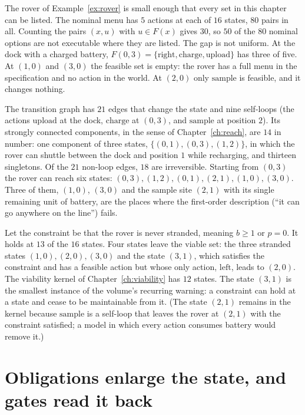 The rover of Example~\ref{ex:rover} is small enough that every set in this chapter can be listed. The nominal menu has $5$ actions at each of $16$ states, $80$ pairs in all. Counting the pairs $(x,u)$ with $u\in F(x)$ gives $30$, so $50$ of the $80$ nominal options are not executable where they are listed. The gap is not uniform. At the dock with a charged battery, $F(0,3)=\{\mathrm{right},\mathrm{charge},\mathrm{upload}\}$ has three of five. At $(1,0)$ and $(3,0)$ the feasible set is empty: the rover has a full menu in the specification and no action in the world. At $(2,0)$ only $\mathrm{sample}$ is feasible, and it changes nothing.

The transition graph has $21$ edges that change the state and nine self-loops (the actions $\mathrm{upload}$ at the dock, $\mathrm{charge}$ at $(0,3)$, and $\mathrm{sample}$ at position $2$). Its strongly connected components, in the sense of Chapter~\ref{ch:reach}, are $14$ in number: one component of three states, $\{(0,1),(0,3),(1,2)\}$, in which the rover can shuttle between the dock and position $1$ while recharging, and thirteen singletons. Of the $21$ non-loop edges, $18$ are irreversible. Starting from $(0,3)$ the rover can reach six states: $(0,3),(1,2),(0,1),(2,1),(1,0),(3,0)$. Three of them, $(1,0)$, $(3,0)$ and the sample site $(2,1)$ with its single remaining unit of battery, are the places where the first-order description (``it can go anywhere on the line'') fails.

Let the constraint be that the rover is never stranded, meaning $b\ge1$ or $p=0$. It holds at $13$ of the $16$ states. Four states leave the viable set: the three stranded states $(1,0),(2,0),(3,0)$ and the state $(3,1)$, which satisfies the constraint and has a feasible action but whose only action, $\mathrm{left}$, leads to $(2,0)$. The viability kernel of Chapter~\ref{ch:viability} has $12$ states. The state $(3,1)$ is the smallest instance of the volume's recurring warning: a constraint can hold at a state and cease to be maintainable from it. (The state $(2,1)$ remains in the kernel because $\mathrm{sample}$ is a self-loop that leaves the rover at $(2,1)$ with the constraint satisfied; a model in which every action consumes battery would remove it.)

\section{Obligations enlarge the state, and gates read it back}\label{sec:rover-obl}

